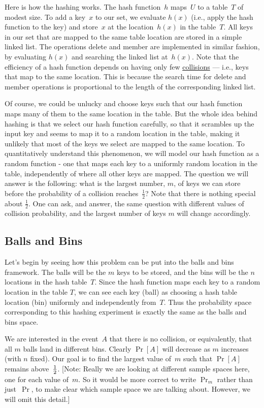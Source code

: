 \documentclass[11pt]{article}
\def\half{{\textstyle{1\over 2}}}
\def\ul#1{\underline{#1}}
\begin{document}
Here is how the hashing works. The hash function~$h$ maps~$U$ to a table~$T$ of modest size.  To
{\sc add} a key~$x$ to our set, we evaluate $h(x)$ (i.e., apply
the hash function to the key) and store~$x$ at the location~$h(x)$
in the table~$T$.  All keys in our set that are mapped to the same 
table location are stored in a simple linked list.  The operations
{\sc delete} and {\sc member} are implemented in similar fashion,
by evaluating $h(x)$ and searching the linked list at~$h(x)$.
Note that the efficiency of a hash function depends on having
only few \ul{collisions} --- i.e., keys that map to the same
location.  This is because the search time for {\sc delete} and
{\sc member} operations is proportional to the length of the 
corresponding linked list.

Of course, we could be unlucky and choose keys such that 
our hash function maps many of them to the same location in the 
table. But the whole idea behind hashing is that we select our 
hash function carefully, so that it scrambles up the input key
and seems to map it to a random location in the table, making it
unlikely that most of the keys we select are mapped to the same 
location. To quantitatively understand this phenomenon, we will
model our hash function as a random function - one that maps 
each key to a uniformly random location in the table, independently
of where all other keys are mapped. The question we will answer 
is the following: what is the largest number, $m$, of keys
we can store before the probability of a collision reaches~$\frac{1}{2}$?
Note that there is nothing special about $\frac{1}{2}$. One can ask,
and answer, the same question with different values of collision probability, and the largest number of keys $m$ 
will change accordingly. 


\subsection*{Balls and Bins}
Let's begin by seeing how this problem can be put into the balls
and bins framework.  The balls will be the $m$ keys to be stored, and
the bins will be the $n$ locations in the hash table~$T$.  
Since the hash function maps each key to a random location in the 
table $T$, we can see each key (ball) as choosing a hash table location (bin)
uniformly and independently from~$T$.  Thus the probability space
corresponding to this hashing experiment is exactly the same as
the balls and bins space.

We are interested in the event~$A$ that there is no collision,
or equivalently, that all $m$ balls land in different bins.  Clearly
$\Pr[A]$ will decrease as $m$ increases (with $n$ fixed).  Our goal
is to find the largest value of~$m$ such that $\Pr[A]$ remains above~$\half$.
[Note: Really we are looking at different sample spaces here, one for
each value of~$m$.  So it would be more correct to write $\Pr_m$
rather than just~$\Pr$, to make clear which sample space we are 
talking about.  However, we will omit this detail.]
\end{document}
